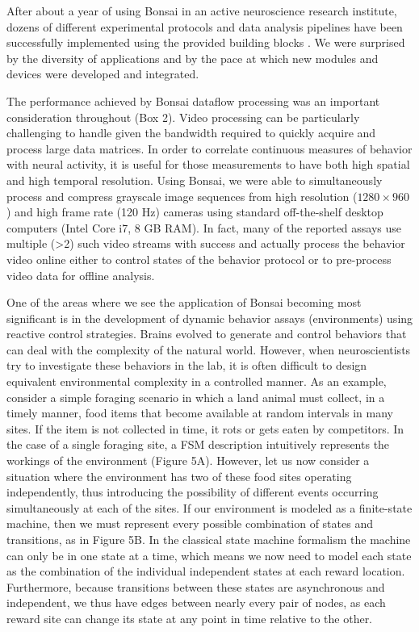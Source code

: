 After about a year of using Bonsai in an active neuroscience research institute, dozens of different experimental protocols and data analysis pipelines have been successfully implemented using the provided building blocks \cite{Gouvea2014, Itskov2014, Tecuapetla2014}. We were surprised by the diversity of applications and by the pace at which new modules and devices were developed and integrated.

The performance achieved by Bonsai dataflow processing was an important consideration throughout (Box 2). Video processing can be particularly challenging to handle given the bandwidth required to quickly acquire and process large data matrices. In order to correlate continuous measures of behavior with neural activity, it is useful for those measurements to have both high spatial and high temporal resolution. Using Bonsai, we were able to simultaneously process and compress grayscale image sequences from high resolution ($1280 \times 960$) and high frame rate (120 Hz) cameras using standard off-the-shelf desktop computers (Intel Core i7, 8 GB RAM). In fact, many of the reported assays use multiple (>2) such video streams with success and actually process the behavior video online either to control states of the behavior protocol or to pre-process video data for offline analysis.

One of the areas where we see the application of Bonsai becoming most significant is in the development of dynamic behavior assays (environments) using reactive control strategies. Brains evolved to generate and control behaviors that can deal with the complexity of the natural world. However, when neuroscientists try to investigate these behaviors in the lab, it is often difficult to design equivalent environmental complexity in a controlled manner. As an example, consider a simple foraging scenario in which a land animal must collect, in a timely manner, food items that become available at random intervals in many sites. If the item is not collected in time, it rots or gets eaten by competitors. In the case of a single foraging site, a FSM description intuitively represents the workings of the environment (Figure 5A). However, let us now consider a situation where the environment has two of these food sites operating independently, thus introducing the possibility of different events occurring simultaneously at each of the sites. If our environment is modeled as a finite-state machine, then we must represent every possible combination of states and transitions, as in Figure 5B. In the classical state machine formalism the machine can only be in one state at a time, which means we now need to model each state as the combination of the individual independent states at each reward location. Furthermore, because transitions between these states are asynchronous and independent, we thus have edges between nearly every pair of nodes, as each reward site can change its state at any point in time relative to the other.

